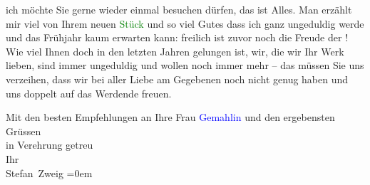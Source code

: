                ich möchte Sie gerne wieder einmal besuchen dürfen, das ist Alles. Man erzählt mir
               viel von Ihrem neuen \textcolor{green}{Stück}{}\ledrightnote{{$\rightarrow$}\emph{\textcolor{green}{Das weite Land. Tragikomödie in fünf Akten}}} und
               so viel Gutes dass ich ganz ungeduldig werde und das Frühjahr kaum erwarten kann:
               freilich ist zuvor noch die Freude der \label{K_L03625-2v}\label{}! Wie viel Ihnen
               doch in den letzten Jahren gelungen ist, wir, die wir Ihr Werk lieben, sind immer
                   ungeduldig und wollen noch immer {\pb}mehr – das müssen Sie uns verzeihen,
               dass wir bei aller Liebe am Gegebenen noch nicht genug haben und uns doppelt auf das
               Werdende freuen.\pend
           
\pstart
           Mit den besten Empfehlungen an Ihre Frau \textcolor{blue}{Gemahlin}{}\ledrightnote{{$\rightarrow$}\emph{\textcolor{blue}{Olga Schnitzler}}} und den ergebensten Grüssen{\\[\baselineskip]}in Verehrung
               getreu{\\[\baselineskip]} Ihr{\\[\baselineskip]}\spacefill\mbox{Stefan Zweig}\pend
           \leftskip=0em{}\endnumbering{}
\begin{anhang}
\end{anhang}
      
